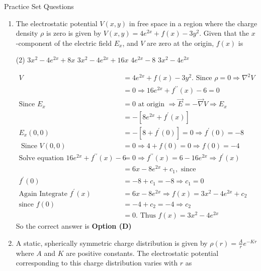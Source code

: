 \begin{abox}
Practice Set Questions
\end{abox}
\begin{enumerate}
	\item  The electrostatic potential $V(x, y)$ in free space in a region where the charge density $\rho$ is zero is given by $V(x, y)=4 e^{2 x}+f(x)-3 y^{2}$. Given that the $x$-component of the electric field $E_{x}$, and $V$ are zero at the origin, $f(x)$ is
	{}
	\begin{tasks}(2)
		\task[\textbf{A.}] $3 x^{2}-4 e^{2 x}+8 x$
		\task[\textbf{B.}] $3 x^{2}-4 e^{2 x}+16 x$
		\task[\textbf{C.}] $4 e^{2 x}-8$
		\task[\textbf{D.}] $3 x^{2}-4 e^{2 x}$
	\end{tasks}
	\begin{answer}
		\begin{align*}
		V&=4 e^{2 x}+f(x)-3 y^{2} .\text{ Since }\rho=0 \Rightarrow \nabla^{2} V\\&=0 \Rightarrow 16 e^{2 x}+f^{\prime \prime}(x)-6=0\\
		\text{Since }E_{x}&=0\text{ at origin }\Rightarrow \vec{E}=-\vec{\nabla} V \Rightarrow E_{x}\\&=-\left[8 e^{2 x}+f^{\prime}(x)\right]\\
		E_{x}(0,0)&=-\left[8+f^{\prime}(0)\right]=0 \Rightarrow f^{\prime}(0)=-8\\
		\text{	Since }V(0,0)&=0 \Rightarrow 4+f(0)=0 \Rightarrow f(0)=-4\\
		\text{Solve equation }16 e^{2 x}+f^{\prime \prime}(x)-6&=0 \Rightarrow f^{\prime \prime}(x)=6-16 e^{2 x} \Rightarrow f^{\prime}(x)\\&=6 x-8 e^{2 x}+c_{1},\text{ since}\\
		f^{\prime}(0)&=-8+c_{1}=-8 \Rightarrow c_{1}=0\\
		\text{Again Integrate }f^{\prime}(x)&=6 x-8 e^{2 x} \Rightarrow f(x)=3 x^{2}-4 e^{2 x}+c_{2}\\
		\text{since }f(0)&=-4+c_{2}=-4 \Rightarrow c_{2}\\&=0.\text{ Thus }f(x)=3 x^{2}-4 e^{2 x}
		\end{align*}
		So the correct answer is \textbf{Option (D)}
	\end{answer}
	\item A static, spherically symmetric charge distribution is given by $\rho(r)=\frac{A}{r} e^{-K r}$ where $A$ and $K$ are positive constants. The electrostatic potential corresponding to this charge distribution varies with $r$ as

\end{enumerate}
